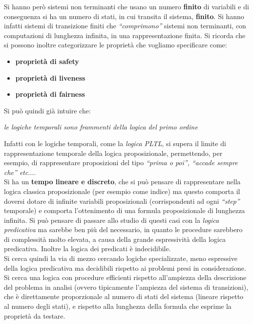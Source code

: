 \documentclass[a4paper,12pt, oneside]{book}
\begin{document}
Si hanno però sistemi non terminanti che usano un numero \textbf{finito} di
variabili e di conseguenza si ha un numero di stati, in cui transita il sistema,
\textbf{finito}. Si hanno infatti sistemi di transizione finiti che
\textit{``comprimono''} sistemi non terminanti, con computazioni di lunghezza
infinita, in una rappresentazione finita.
\newpage
Si ricorda che si possono inoltre categorizzare le proprietà che vogliamo
specificare come: 
\begin{itemize}
  \item \textbf{proprietà di safety}
  \item \textbf{proprietà di liveness}
  \item \textbf{proprietà di fairness}
\end{itemize}
Si può quindi già intuire che:
\begin{center}
  \textit{le logiche temporali sono frammenti della logica del primo ordine}
\end{center}
Infatti con le logiche temporali, come la \textit{logica PLTL}, si supera il
limite di rappresentazione temporale della logica proposizionale, permettendo,
per esempio, di rappresentare proposizioni del tipo \textit{``prima o poi'',
  ``accade sempre che'' etc$\ldots$}.\\
Si ha un \textbf{tempo lineare e discreto}, che si può pensare di rappresentare
nella logica classica proposizionale (per esempio come indice) ma questo
comporta il doversi dotare di infinite variabili proposizionali (corrispondenti
ad ogni \textit{``step''} temporale) e comporta l'ottenimento di una formula
proposizionale di lunghezza infinita. Si può pensare di passare allo studio di
questi casi con la \textit{logica predicativa} ma sarebbe ben più del
necessario, in quanto le procedure sarebbero di complessità molto elevata, a
causa della grande espressività della logica predicativa. Inoltre la logica dei
predicati è indecidibile. \\
Si cerca quindi la via di mezzo cercando logiche specializzate, meno espressive
della logica predicativa ma decidibili rispetto ai problemi presi in
considerazione. Si cerca una logica con procedure efficienti rispetto
all'ampiezza della descrizione del problema in analisi (ovvero tipicamente
l'ampiezza del sistema di transizioni), che è direttamente proporzionale al
numero di stati del sistema (lineare rispetto al numero degli stati), e rispetto
alla lunghezza della formula che esprime la proprietà da testare.
\newpage
\end{document}
